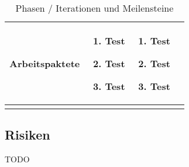 \begin{landscape}
\begin{longtable}{l p{5.5cm} p{5.5cm} p{5.5cm}}
        \textbf{Arbeitspaktete}
                                & \begin{enumerate}[noitemsep]
                                    \item Test
                                    \item Test
                                    \item Test
                                \end{enumerate}
                                & \begin{enumerate}[noitemsep]
                                    \item Test
                                    \item Test
                                    \item Test
                                \end{enumerate}
                                & \\
        
        \bottomrule
    \caption{Phasen / Iterationen und Meilensteine}
    \label{table:Phasen / Iterationen und Meilensteine}
\end{longtable}
\end{landscape}

\subsection{Risiken}
\label{sub:Risiken}

TODO